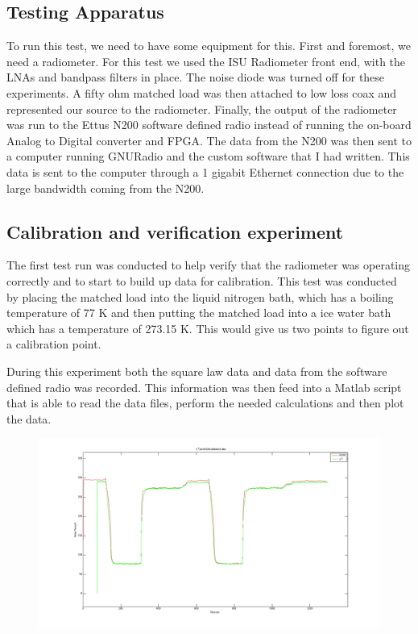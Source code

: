 \subsection{Testing Apparatus}
To run this test, we need to have some equipment for this.  First and foremost, we need a radiometer.  For this test we used the ISU Radiometer front end, with the LNAs and bandpass filters in place.  The noise diode was turned off for these experiments.  A fifty ohm matched load was then attached to low loss coax and represented our source to the radiometer.  Finally, the output of the radiometer was run to the Ettus N200 software defined radio instead of running the on-board Analog to Digital converter and FPGA.  The data from the N200 was then sent to a computer running GNURadio and the custom software that I had written.  This data is sent to the computer through a 1 gigabit Ethernet connection due to the large bandwidth coming from the N200.

\subsection{Calibration and verification experiment}
The first test run was conducted to help verify that the radiometer was operating correctly and to start to build up data for calibration.  This test was conducted by placing the matched load into the liquid nitrogen bath, which has a boiling temperature of 77 K and then putting the matched load into a ice water bath which has a temperature of 273.15 K.  This would give us two points to figure out a calibration point.

During this experiment both the square law data and data from the software defined radio was recorded.  This information was then feed into a Matlab script that is able to read the data files, perform the needed calculations and then plot the data.  

\begin{figure}[h!tb] \centering

\includegraphics[width=\textwidth]{Images/lab1_both_calib.png}

\label{lab1_x2_n200}
\end{figure}


